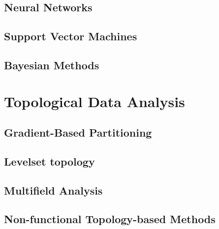 \subsection{Neural Networks}
\subsection{Support Vector Machines}
\subsection{Bayesian Methods}

\section{Topological Data Analysis}
\subsection{Gradient-Based Partitioning}
\subsection{Levelset topology}
\subsection{Multifield Analysis}
\subsection{Non-functional Topology-based Methods}
